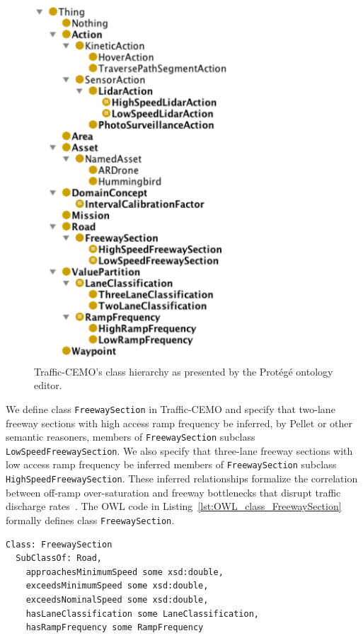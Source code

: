 \begin{figure}[ht]
\centering
\includegraphics[scale=0.63]{img/traffic-cemo.pdf}
\caption[Traffic-CEMO's class hierarchy]{Traffic-CEMO's class hierarchy as presented by the Prot\'eg\'e ontology editor.}
\label{fig:traffic_CEMO}
\end{figure}

We define class \texttt{FreewaySection} in Traffic-CEMO and specify that two-lane freeway sections with high access ramp frequency be inferred, by Pellet or other semantic reasoners, members of \texttt{FreewaySection} subclass \texttt{LowSpeedFreewaySection}. We also specify that three-lane freeway sections with low access ramp frequency be inferred members of \texttt{FreewaySection} subclass \texttt{HighSpeedFreewaySection}. These inferred relationships formalize the correlation between off-ramp over-saturation and freeway bottlenecks that disrupt traffic discharge rates~\cite{Cassidy_2002}. The OWL code in Listing~\ref{lst:OWL_class_FreewaySection} formally defines class \texttt{FreewaySection}.

\begin{lstlisting}[caption={OWL code for class \texttt{FreewaySection}},label=lst:OWL_class_FreewaySection]
Class: FreewaySection
  SubClassOf: Road,
    approachesMinimumSpeed some xsd:double,
    exceedsMinimumSpeed some xsd:double,
    exceedsNominalSpeed some xsd:double,
    hasLaneClassification some LaneClassification,
    hasRampFrequency some RampFrequency
\end{lstlisting}

